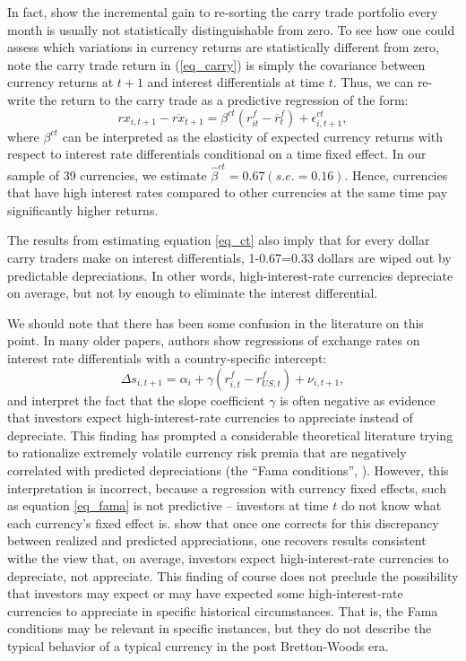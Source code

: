 \documentclass{ar-1col}
\begin{document}
In fact, \citet{HassanMano2019} show the incremental gain to re-sorting the carry trade portfolio every month is usually not statistically distinguishable from zero. To see how one could assess which variations in currency returns are statistically different from zero, note the carry trade return in (\ref{eq_carry}) is simply the covariance between currency returns at $t+1$ and interest differentials at time $t$. Thus, we can re-write the return to the carry trade as a predictive regression of the form:
\begin{equation}
    rx_{i,t+1} - \overline{rx}_{t+1} 
    = \beta^{ct}\left( r^f_{it}-\overline{r}^f_{t}\right) +\epsilon_{i,t+1}^{ct},  \label{eq_ct}
\end{equation} 
where $\beta ^{ct}$ can be interpreted as the elasticity of expected currency returns with respect to interest rate differentials conditional on a time fixed effect. In our sample of 39 currencies, we estimate $\hat{\beta}^{ct}=0.67 (s.e.=0.16)$. Hence, currencies that have high interest rates compared to other currencies at the same time pay significantly higher returns.

The results from estimating equation \eqref{eq_ct} also imply that for every dollar carry traders make on interest differentials, 1-0.67=0.33 dollars are wiped out by predictable depreciations. In other words, high-interest-rate currencies depreciate on average, but not by enough to eliminate the interest differential.

We should note that there has been some confusion in the literature on this point. In many older papers, authors show regressions of exchange rates on interest rate differentials with a country-specific intercept:
\begin{equation}
    \Delta s_{i,t+1} 
    = \alpha_i + \gamma \left(r^f_{i, t} - r^f_{US, t}\right) + \nu_{i, t+1},
\label{eq_fama} 
\end{equation}
and interpret the fact that the slope coefficient $\gamma$ is often negative as evidence that investors expect high-interest-rate currencies to appreciate instead of depreciate. This finding has prompted a considerable theoretical literature trying to rationalize extremely volatile currency risk premia that are negatively correlated with predicted depreciations (the ``Fama conditions'', \citet{Backusetal2001}). However, this interpretation is incorrect, because a regression with currency fixed effects, such as equation \eqref{eq_fama} is not predictive -- investors at time $t$ do not know what each currency's fixed effect is. \citet{HassanMano2019} show that once one corrects for this discrepancy between realized and predicted appreciations, one recovers results consistent withe the view that, on average, investors expect high-interest-rate currencies to depreciate, not appreciate. This finding of course does not preclude the possibility that investors may expect or may have expected some high-interest-rate currencies to appreciate in specific historical circumstances. That is, the Fama conditions may be relevant in specific instances, but they do not describe the typical behavior of a typical currency in the post Bretton-Woods era.
\end{document}

